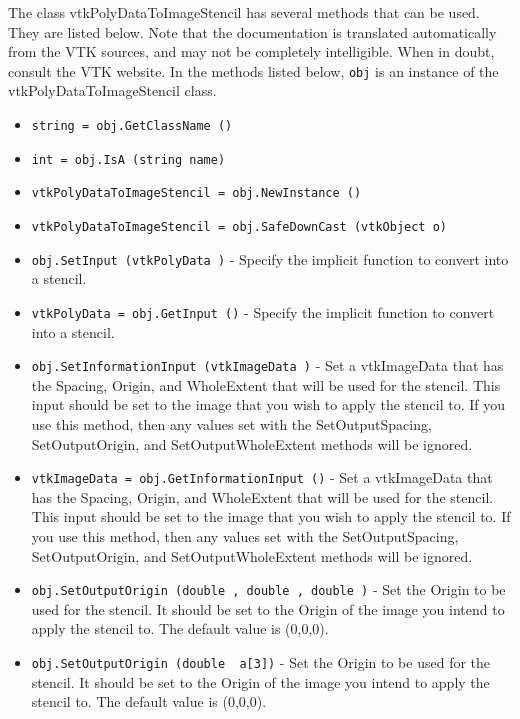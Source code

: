 The class vtkPolyDataToImageStencil has several methods that can be used.
  They are listed below.
Note that the documentation is translated automatically from the VTK sources,
and may not be completely intelligible.  When in doubt, consult the VTK website.
In the methods listed below, \verb|obj| is an instance of the vtkPolyDataToImageStencil class.
\begin{itemize}
\item  \verb|string = obj.GetClassName ()|

\item  \verb|int = obj.IsA (string name)|

\item  \verb|vtkPolyDataToImageStencil = obj.NewInstance ()|

\item  \verb|vtkPolyDataToImageStencil = obj.SafeDownCast (vtkObject o)|

\item  \verb|obj.SetInput (vtkPolyData )| -  Specify the implicit function to convert into a stencil.

\item  \verb|vtkPolyData = obj.GetInput ()| -  Specify the implicit function to convert into a stencil.

\item  \verb|obj.SetInformationInput (vtkImageData )| -  Set a vtkImageData that has the Spacing, Origin, and
 WholeExtent that will be used for the stencil.  This
 input should be set to the image that you wish to
 apply the stencil to.  If you use this method, then
 any values set with the SetOutputSpacing, SetOutputOrigin,
 and SetOutputWholeExtent methods will be ignored.

\item  \verb|vtkImageData = obj.GetInformationInput ()| -  Set a vtkImageData that has the Spacing, Origin, and
 WholeExtent that will be used for the stencil.  This
 input should be set to the image that you wish to
 apply the stencil to.  If you use this method, then
 any values set with the SetOutputSpacing, SetOutputOrigin,
 and SetOutputWholeExtent methods will be ignored.

\item  \verb|obj.SetOutputOrigin (double , double , double )| -  Set the Origin to be used for the stencil.  It should be
 set to the Origin of the image you intend to apply the
 stencil to. The default value is (0,0,0).

\item  \verb|obj.SetOutputOrigin (double  a[3])| -  Set the Origin to be used for the stencil.  It should be
 set to the Origin of the image you intend to apply the
 stencil to. The default value is (0,0,0).


\end{itemize}
